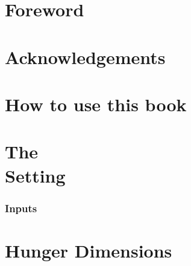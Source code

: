 \documentclass[print,Draft]{faosyb}
\begin{document}

\addtocounter{page}{1}  %

\mainmatter



\part*{Foreword}
\lipsum[1-6]

\part*{Ack\-now\-ledgements}
\lipsum[1-5]

\part*{How to use this book}


\tableofcontents
\listofcharts
\listofmaps
\listoftables



\part[The Setting]{The\\ Setting}
\lipsum
\EndPartIntro




\begin{tablepages}
\section{Inputs}
\small
  
\clearpage

\end{tablepages}


\part{Hunger Dimensions}
\lipsum
\EndPartIntro



\end{document}

